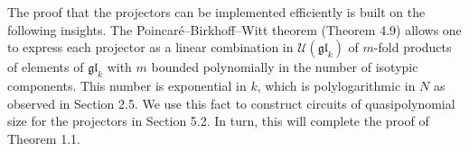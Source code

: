 The proof that the projectors can be implemented efficiently is built on the following insights. The Poincaré–Birkhoff–Witt theorem (Theorem 4.9) allows one to express each projector as a linear combination in $\mathcal{U}(\mathfrak{gl}_{k})$ of $m$-fold products of elements of $\mathfrak{gl}_{k}$ with $m$ bounded polynomially in the number of isotypic components. This number is exponential in $k$, which is polylogarithmic in $N$ as observed in Section 2.5. We use this fact to construct circuits of quasipolynomial size for the projectors in Section 5.2. In turn, this will complete the proof of Theorem 1.1.



